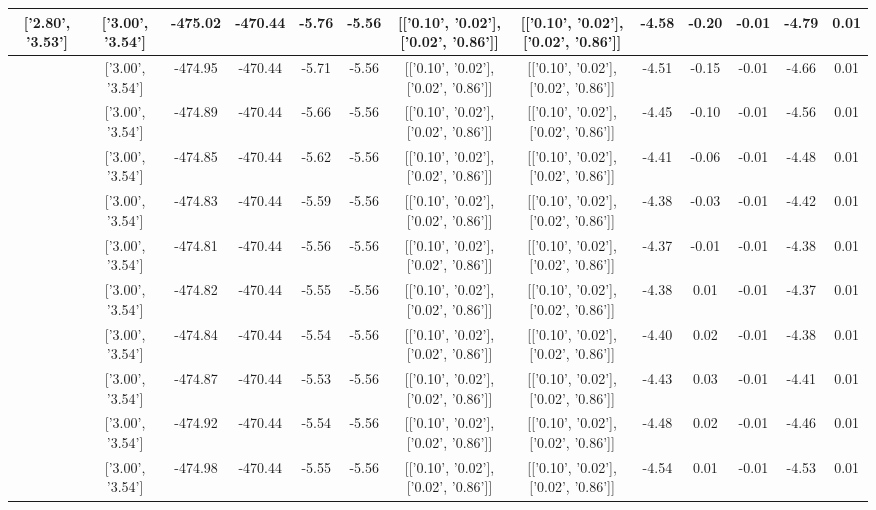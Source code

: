 \begin{table}[htbp]
\begin{adjustbox}{angle=90}
\begin{tabular}{|c|c|c|c|c|c|c|c|c|c|c|c|c|}
 ['2.80', '3.53'] & ['3.00', '3.54'] & -475.02 & -470.44 & -5.76 & -5.56 & [['0.10', '0.02'], ['0.02', '0.86']] & [['0.10', '0.02'], ['0.02', '0.86']] & -4.58 & -0.20 & -0.01 & -4.79 & 0.01\\ \hline
 ['2.83', '3.53'] & ['3.00', '3.54'] & -474.95 & -470.44 & -5.71 & -5.56 & [['0.10', '0.02'], ['0.02', '0.86']] & [['0.10', '0.02'], ['0.02', '0.86']] & -4.51 & -0.15 & -0.01 & -4.66 & 0.01\\ \hline
 ['2.87', '3.53'] & ['3.00', '3.54'] & -474.89 & -470.44 & -5.66 & -5.56 & [['0.10', '0.02'], ['0.02', '0.86']] & [['0.10', '0.02'], ['0.02', '0.86']] & -4.45 & -0.10 & -0.01 & -4.56 & 0.01\\ \hline
 ['2.91', '3.53'] & ['3.00', '3.54'] & -474.85 & -470.44 & -5.62 & -5.56 & [['0.10', '0.02'], ['0.02', '0.86']] & [['0.10', '0.02'], ['0.02', '0.86']] & -4.41 & -0.06 & -0.01 & -4.48 & 0.01\\ \hline
 ['2.95', '3.54'] & ['3.00', '3.54'] & -474.83 & -470.44 & -5.59 & -5.56 & [['0.10', '0.02'], ['0.02', '0.86']] & [['0.10', '0.02'], ['0.02', '0.86']] & -4.38 & -0.03 & -0.01 & -4.42 & 0.01\\ \hline
 ['2.99', '3.54'] & ['3.00', '3.54'] & -474.81 & -470.44 & -5.56 & -5.56 & [['0.10', '0.02'], ['0.02', '0.86']] & [['0.10', '0.02'], ['0.02', '0.86']] & -4.37 & -0.01 & -0.01 & -4.38 & 0.01\\ \hline
 ['3.02', '3.54'] & ['3.00', '3.54'] & -474.82 & -470.44 & -5.55 & -5.56 & [['0.10', '0.02'], ['0.02', '0.86']] & [['0.10', '0.02'], ['0.02', '0.86']] & -4.38 & 0.01 & -0.01 & -4.37 & 0.01\\ \hline
 ['3.06', '3.54'] & ['3.00', '3.54'] & -474.84 & -470.44 & -5.54 & -5.56 & [['0.10', '0.02'], ['0.02', '0.86']] & [['0.10', '0.02'], ['0.02', '0.86']] & -4.40 & 0.02 & -0.01 & -4.38 & 0.01\\ \hline
 ['3.10', '3.55'] & ['3.00', '3.54'] & -474.87 & -470.44 & -5.53 & -5.56 & [['0.10', '0.02'], ['0.02', '0.86']] & [['0.10', '0.02'], ['0.02', '0.86']] & -4.43 & 0.03 & -0.01 & -4.41 & 0.01\\ \hline
 ['3.14', '3.55'] & ['3.00', '3.54'] & -474.92 & -470.44 & -5.54 & -5.56 & [['0.10', '0.02'], ['0.02', '0.86']] & [['0.10', '0.02'], ['0.02', '0.86']] & -4.48 & 0.02 & -0.01 & -4.46 & 0.01\\ \hline
 ['3.18', '3.55'] & ['3.00', '3.54'] & -474.98 & -470.44 & -5.55 & -5.56 & [['0.10', '0.02'], ['0.02', '0.86']] & [['0.10', '0.02'], ['0.02', '0.86']] & -4.54 & 0.01 & -0.01 & -4.53 & 0.01\\ \hline

\end{tabular}
\end{adjustbox}
\end{table}
